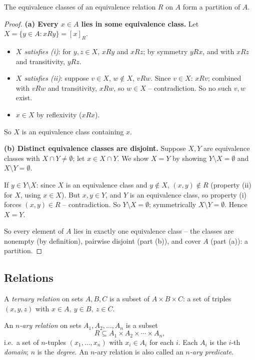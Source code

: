 \documentclass[11pt]{article}
\begin{document}
\begin{theorem}
The equivalence classes of an equivalence relation $R$ on $A$ form a partition of $A$.
\end{theorem}
\begin{proof}
\textbf{(a) Every $x \in A$ lies in some equivalence class.} Let $X = \{y \in A : xRy\} = [x]_R$.
\begin{itemize}
    \item \emph{$X$ satisfies (i)}: for $y,z \in X$, $xRy$ and $xRz$; by symmetry $yRx$, and with $xRz$ and transitivity, $yRz$.
    \item \emph{$X$ satisfies (ii)}: suppose $v \in X$, $w \notin X$, $vRw$. Since $v \in X$: $xRv$; combined with $vRw$ and transitivity, $xRw$, so $w \in X$ -- contradiction. So no such $v,w$ exist.
    \item $x \in X$ by reflexivity ($xRx$).
\end{itemize}
So $X$ is an equivalence class containing $x$.

\textbf{(b) Distinct equivalence classes are disjoint.} Suppose $X,Y$ are equivalence classes with $X \cap Y \neq \emptyset$; let $x \in X \cap Y$. We show $X = Y$ by showing $Y \setminus X = \emptyset$ and $X \setminus Y = \emptyset$.

If $y \in Y \setminus X$: since $X$ is an equivalence class and $y \notin X$, $(x,y) \notin R$ (property (ii) for $X$, using $x \in X$). But $x,y \in Y$, and $Y$ is an equivalence class, so property (i) forces $(x,y) \in R$ -- contradiction. So $Y \setminus X = \emptyset$; symmetrically $X \setminus Y = \emptyset$. Hence $X = Y$.

So every element of $A$ lies in exactly one equivalence class -- the classes are nonempty (by definition), pairwise disjoint (part (b)), and cover $A$ (part (a)): a partition.
\end{proof}

\subsection{Relations}
\label{sec:2-17}

\begin{definition}
A \emph{ternary relation} on sets $A,B,C$ is a subset of $A \times B \times C$: a set of triples $(x,y,z)$ with $x\in A,\ y\in B,\ z\in C$.
\end{definition}

\begin{definition}
An \emph{$n$-ary relation} on sets $A_1,A_2,\dots,A_n$ is a subset
\[
R \subseteq A_1 \times A_2 \times \cdots \times A_n,
\]
i.e.\ a set of $n$-tuples $(x_1,\dots,x_n)$ with $x_i \in A_i$ for each $i$. Each $A_i$ is the $i$-th \emph{domain}; $n$ is the \emph{degree}. An $n$-ary relation is also called an \emph{$n$-ary predicate}.
\end{definition}
\end{document}
